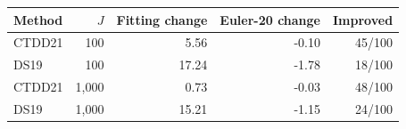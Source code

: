 \begin{tabular}{lrrrr}
\toprule
Method & $J$ & Fitting change & Euler-20 change & Improved \\
\midrule
CTDD21 & 100 & 5.56 & -0.10 & 45/100 \\
DS19 & 100 & 17.24 & -1.78 & 18/100 \\
CTDD21 & 1,000 & 0.73 & -0.03 & 48/100 \\
DS19 & 1,000 & 15.21 & -1.15 & 24/100 \\
\bottomrule
\end{tabular}
